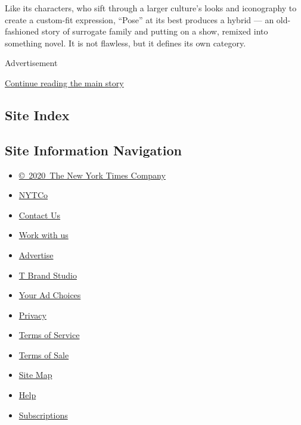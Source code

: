 Like its characters, who sift through a larger culture's looks and
iconography to create a custom-fit expression, ``Pose'' at its best
produces a hybrid --- an old-fashioned story of surrogate family and
putting on a show, remixed into something novel. It is not flawless, but
it defines its own category.

Advertisement

\protect\hyperlink{after-bottom}{Continue reading the main story}

\hypertarget{site-index}{%
\subsection{Site Index}\label{site-index}}

\hypertarget{site-information-navigation}{%
\subsection{Site Information
Navigation}\label{site-information-navigation}}

\begin{itemize}
\tightlist
\item
  \href{https://help.nytimes3xbfgragh.onion/hc/en-us/articles/115014792127-Copyright-notice}{©~2020~The
  New York Times Company}
\end{itemize}

\begin{itemize}
\tightlist
\item
  \href{https://www.nytco.com/}{NYTCo}
\item
  \href{https://help.nytimes3xbfgragh.onion/hc/en-us/articles/115015385887-Contact-Us}{Contact
  Us}
\item
  \href{https://www.nytco.com/careers/}{Work with us}
\item
  \href{https://nytmediakit.com/}{Advertise}
\item
  \href{http://www.tbrandstudio.com/}{T Brand Studio}
\item
  \href{https://www.nytimes3xbfgragh.onion/privacy/cookie-policy\#how-do-i-manage-trackers}{Your
  Ad Choices}
\item
  \href{https://www.nytimes3xbfgragh.onion/privacy}{Privacy}
\item
  \href{https://help.nytimes3xbfgragh.onion/hc/en-us/articles/115014893428-Terms-of-service}{Terms
  of Service}
\item
  \href{https://help.nytimes3xbfgragh.onion/hc/en-us/articles/115014893968-Terms-of-sale}{Terms
  of Sale}
\item
  \href{https://spiderbites.nytimes3xbfgragh.onion}{Site Map}
\item
  \href{https://help.nytimes3xbfgragh.onion/hc/en-us}{Help}
\item
  \href{https://www.nytimes3xbfgragh.onion/subscription?campaignId=37WXW}{Subscriptions}
\end{itemize}
